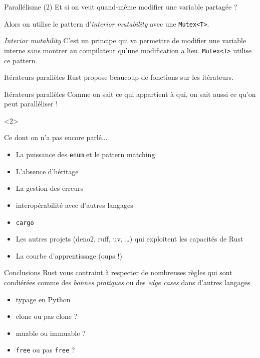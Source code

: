 \documentclass[usenames,dvipsnames]{beamer}
\begin{document}
\begin{frame}{Parallélisme (2)}
	Et si on veut quand-même modifier une variable partagée ?
	
	Alors on utilise le pattern d'\textit{interior mutability} avec une \texttt{Mutex<T>}.
	
	\begin{blueblock}{\textit{Interior mutability}}
		C'est un principe qui va permettre de modifier une variable interne sans montrer au compilateur qu'une modification a lieu. \texttt{Mutex<T>} utilise ce pattern.
	\end{blueblock}
\end{frame}

\begin{frame}[fragile]{Itérateurs parallèles}
	Rust propose beaucoup de fonctions sur les itérateurs.
	
	\begin{blueblock}{Itérateurs parallèles}
		Comme on sait ce qui appartient à qui, on sait aussi ce qu'on peut paralléliser !	
	\end{blueblock}
	
\end{frame}


\begin{frame}{Ce dont on n'a pas encore parlé...}
	\begin{itemize}
		\item La puissance des \texttt{enum} et le pattern matching
		\item L'absence d'héritage
		\item La gestion des erreurs
		\item interopérabilité avec d'autres langages
		\item \texttt{cargo}
		\item Les autres projets (deno2, ruff, uv, \dots) qui exploitent les capacités de Rust
		\item La courbe d'apprentissage (oups !)
	\end{itemize}
\end{frame}

\begin{frame}{Conclusions}
	Rust vous contraint à respecter de nombreuses règles qui sont condiérées comme des \textit{bonnes pratiques} ou des \textit{edge cases} dans d'autres langages
	\begin{itemize}
		\item typage en Python
		\item clone ou pas clone ?
		\item muable ou immuable ?
		\item \texttt{free} ou pas \texttt{free} ? 
	\end{itemize}
\end{frame}
\end{document}
